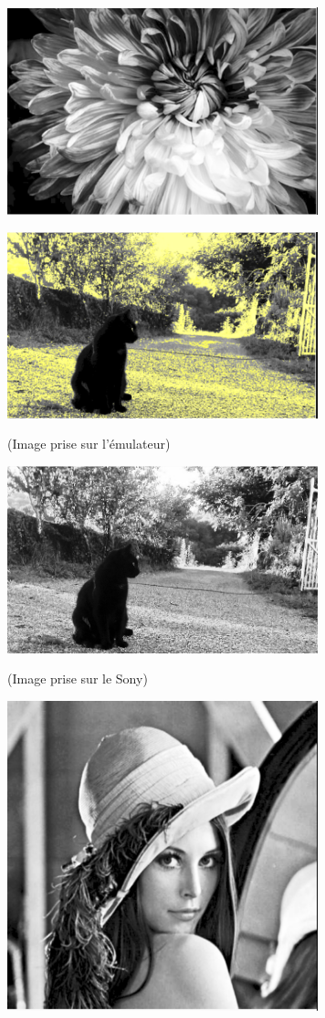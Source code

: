 \documentclass{article}
\begin{document}
\begin{center} 
    \includegraphics[width=9cm]{../Image_fonctions/Multicolor/EgalisationGray.PNG}
\end{center}
\begin{center} 
    \includegraphics[width=9cm]{../Image_fonctions/Cat/EgalisationGray.PNG}
    
    (Image prise sur l'émulateur)
    
    \includegraphics[width=9cm]{../Image_fonctions/Cat/EgalisationGray2.PNG}
    
    (Image prise sur le Sony)
\end{center}
\begin{center} 
    \includegraphics[width=9cm]{../Image_fonctions/Lenna/EgalisationGray.PNG}
\end{center}
\end{document}
